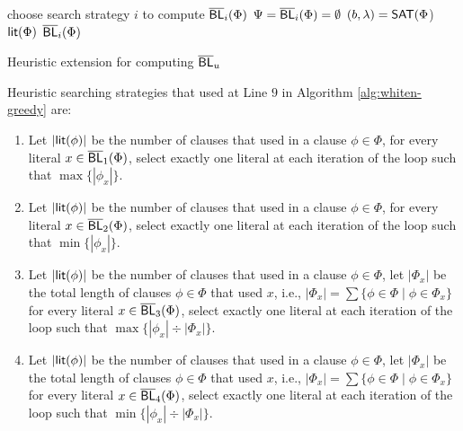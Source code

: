 \begin{algorithm}
\SetAlgoShortEnd
\SetFillComment
{}
choose search strategy $i$ to compute $\overline{\textsf{BL}}_i(\Phi)$\;
$\Psi=\overline{\textsf{BL}}_i(\Phi)=\emptyset$\;
$(b,\lambda)=\textsf{SAT}(\Phi$)\;
 \Return $\textsf{lit}(\Phi)$\;
\Return $\overline{\textsf{BL}}_i(\Phi)$\;
\caption{Heuristic extension for computing $\overline{\textsf{BL}}_u$}\label{alg:whiten-greedy}
\label{alg:wal}
\end{algorithm}
Heuristic searching strategies that used at Line $9$ in Algorithm \ref{alg:whiten-greedy} are:
\begin{enumerate}
    \item Let $|\textsf{lit}(\phi)|$ be the number of clauses that used in a clause $\phi\in\Phi$, for every literal $x\in \overline{\textsf{BL}}_1(\Phi)$, select exactly one literal at each iteration of the loop such that $\max\{|\phi_{x}|\}$.
    \item Let $|\textsf{lit}(\phi)|$ be the number of clauses that used in a clause $\phi\in\Phi$, for every literal $x\in \overline{\textsf{BL}}_2(\Phi)$, select exactly one literal at each iteration of the loop such that $\min\{|\phi_{x}|\}$.
    \item Let $|\textsf{lit}(\phi)|$ be the number of clauses that used in a clause $\phi\in\Phi$, let $|\Phi_{x}|$ be the total length of clauses $\phi\in\Phi$ that used $x$, i.e., $|\Phi_{x}|=\sum\{\phi\in\Phi \mid \phi\in\Phi_{x}\}$ for every literal $x\in \overline{\textsf{BL}}_3(\Phi)$, select exactly one literal at each iteration of the loop such that $\max\{|\phi_{x}|\div|\Phi_{x}|\}$.
    \item Let $|\textsf{lit}(\phi)|$ be the number of clauses that used in a clause $\phi\in\Phi$, let $|\Phi_{x}|$ be the total length of clauses $\phi\in\Phi$ that used $x$, i.e., $|\Phi_{x}|=\sum\{\phi\in\Phi \mid \phi\in\Phi_{x}\}$ for every literal $x\in \overline{\textsf{BL}}_4(\Phi)$, select exactly one literal at each iteration of the loop such that $\min\{|\phi_{x}|\div|\Phi_{x}|\}$.
\end{enumerate}

